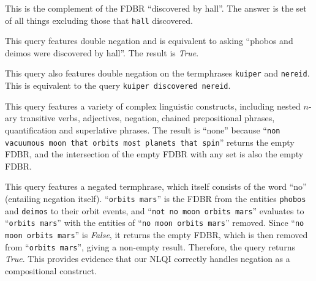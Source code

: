 \documentclass[../main.tex]{subfiles}
\begin{document}
\begin{refsection}
\noindent This is the complement of the FDBR ``discovered by hall''.  The answer is the set of all things excluding those that \texttt{hall} discovered.

\examplespacing


\examplespacing

\noindent This query features double negation and is equivalent to asking ``phobos and deimos were discovered by hall''.  The result is \textit{True}.

\examplespacing


\examplespacing

\noindent This query also features double negation on the termphrases \texttt{kuiper} and \texttt{nereid}.
This is equivalent to the query \texttt{kuiper discovered nereid}.

\examplespacing


\examplespacing

\noindent This query features a variety of complex linguistic constructs, including nested $n$-ary transitive verbs, adjectives, negation, chained prepositional phrases, quantification and superlative phrases.  The result is ``none'' because ``\texttt{non vacuumous moon that orbits most planets that spin}'' returns the empty FDBR, and the intersection of the empty FDBR with any set is also the empty FDBR.

\examplespacing


\examplespacing

\noindent This query features a negated termphrase, which itself consists of the word ``no'' (entailing negation itself). ``\texttt{orbits mars}'' is the FDBR from the entities \texttt{phobos} and \texttt{deimos} to their orbit events, and ``\texttt{not no moon orbits mars}'' evaluates to ``\texttt{orbits mars}'' with the entities of ``\texttt{no moon orbits mars}'' removed.  Since ``\texttt{no moon orbits mars}'' is \textit{False}, it returns the empty FDBR, which is then removed from ``\texttt{orbits mars}'', giving a non-empty result.  Therefore, the query returns \textit{True}. This provides evidence that our NLQI correctly handles negation as a compositional construct.


\end{refsection}
\end{document}

